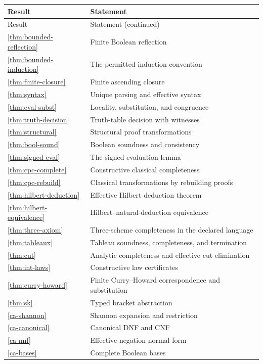 \small
\begin{longtable}{@{}p{}p{}@{}}
\toprule
Result & Statement\\
\midrule
\endfirsthead
\toprule
Result & Statement (continued)\\
\midrule
\endhead
\bottomrule
\endfoot
\ref{thm:bounded-reflection} & Finite Boolean reflection \\
\ref{thm:bounded-induction} & The permitted induction convention \\
\ref{thm:finite-closure} & Finite ascending closure \\
\ref{thm:syntax} & Unique parsing and effective syntax \\
\ref{thm:eval-subst} & Locality, substitution, and congruence \\
\ref{thm:truth-decision} & Truth-table decision with witnesses \\
\ref{thm:structural} & Structural proof transformations \\
\ref{thm:bool-sound} & Boolean soundness and consistency \\
\ref{thm:signed-eval} & The signed evaluation lemma \\
\ref{thm:cpc-complete} & Constructive classical completeness \\
\ref{thm:cpc-rebuild} & Classical transformations by rebuilding proofs \\
\ref{thm:hilbert-deduction} & Effective Hilbert deduction theorem \\
\ref{thm:hilbert-equivalence} & Hilbert--natural-deduction equivalence \\
\ref{thm:three-axiom} & Three-scheme completeness in the declared language \\
\ref{thm:tableaux} & Tableau soundness, completeness, and termination \\
\ref{thm:cut} & Analytic completeness and effective cut elimination \\
\ref{thm:int-laws} & Constructive law certificates \\
\ref{thm:curry-howard} & Finite Curry--Howard correspondence and substitution \\
\ref{thm:sk} & Typed bracket abstraction \\
\ref{ca-shannon} & Shannon expansion and restriction \\
\ref{ca-canonical} & Canonical DNF and CNF \\
\ref{ca-nnf} & Effective negation normal form \\
\ref{ca-bases} & Complete Boolean bases \\

\end{longtable}
